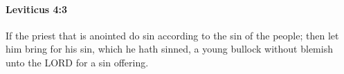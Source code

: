 
		\paragraph{Leviticus 4:3} %
			\label{LEVITICUS-4-3}

			If the priest that is anointed do sin according to the sin of the people; then let him bring for his sin, which he hath sinned, a young bullock without blemish unto the LORD for a sin offering.


